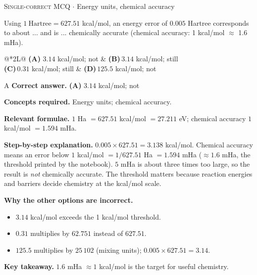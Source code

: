 \documentclass[11pt,a4paper]{article}
\newcommand{\optlabel}[1]{\textbf{(#1)}}
\newcommand{\correctlabel}[1]{\textcolor{okgreen}{\textbf{(#1)}\,\ding{51}}}
\newenvironment{qitem}[1]{\begin{list}{}{\setlength{\leftmargin}{3.3em}\setlength{\labelwidth}{3.1em}%
  \setlength{\labelsep}{0.2em}\setlength{\topsep}{3pt}\setlength{\parsep}{3pt}}\item[\textbf{Q.#1}\hfill]}{\end{list}}
\newcommand{\qsep}{\par\vspace{2pt}{\color{black!15}\hrule}\vspace{4pt}}
\newcommand{\qmeta}[2]{{\footnotesize\color{black!60}\textsc{#1} \;$\cdot$\; #2}\par}
\begin{document}
\qsep

\begin{qitem}{5}
\qmeta{Single-correct MCQ}{Energy units, chemical accuracy}
Using $1\ \text{Hartree} = 627.51$ kcal/mol, an energy error of $0.005$ Hartree corresponds to about ... and is ... chemically
accurate (chemical accuracy: 1 kcal/mol $\approx$ 1.6 mHa).
\par\smallskip\noindent\begin{tabularx}{\linewidth}{@{}*{2}{L}@{}}
\correctlabel{A}\,$3.14$ kcal/mol; not & \optlabel{B}\,$3.14$ kcal/mol; still \\[3pt]
\optlabel{C}\,$0.31$ kcal/mol; still & \optlabel{D}\,$125.5$ kcal/mol; not
\end{tabularx}
\end{qitem}
\begin{solbox}{A}
\textbf{\color{brand}Correct answer.} \textcolor{okgreen}{\textbf{(A)}} $3.14$ kcal/mol; not

\textbf{\color{brand}Concepts required.} Energy units; chemical accuracy.

\textbf{\color{brand}Relevant formulae.} $1$ Ha $= 627.51$ kcal/mol $= 27.211$ eV; chemical accuracy $1$ kcal/mol $= 1.594$ mHa.

\textbf{\color{brand}Step-by-step explanation.} $0.005 \times 627.51 = 3.138$ kcal/mol. Chemical accuracy means an error below $1$ kcal/mol $= 1/627.51$ Ha $= 1.594$ mHa
($\approx 1.6$ mHa, the threshold printed by the notebook). $5$ mHa is about three times too large, so the result is \emph{not}
chemically accurate. The threshold matters because reaction energies and barriers decide chemistry at the kcal/mol scale.

\textbf{\color{brand}Why the other options are incorrect.}
\begin{itemize}[leftmargin=2.4em, itemsep=1pt, topsep=2pt]
\item[\textbf{(B)}] $3.14$ kcal/mol exceeds the 1 kcal/mol threshold.
\item[\textbf{(C)}] $0.31$ multiplies by $62.751$ instead of $627.51$.
\item[\textbf{(D)}] $125.5$ multiplies by $25\,102$ (mixing units); $0.005\times627.51 = 3.14$.
\end{itemize}
\textbf{\color{brand}Key takeaway.} $1.6$ mHa $\approx 1$ kcal/mol is the target for useful chemistry.
\end{solbox}
\qsep
\end{document}
